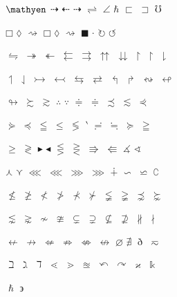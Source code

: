 \documentclass{article}
\begin{document}
$\mathyen$ $\rightdasharrow$ $\leftdasharrow$ $\rightdasharrow$ $\rightleftharpoons$ $\angle$ $\hbar$ $\sqsubset$ $\sqsupset$ $\mho$

$\mdlgwhtsquare$ $\mdlgwhtlozenge$ $\rightsquigarrow$ $\mdlgwhtsquare$ $\mdlgwhtlozenge$ $\rightsquigarrow$ $\mdlgblksquare$ $\cdotp$ $\cwopencirclearrow$ $\acwopencirclearrow$

$\leftrightharpoons$ $\twoheadrightarrow$ $\twoheadleftarrow$ $\leftleftarrows$ $\rightrightarrows$ $\upuparrows$ $\downdownarrows$ $\upharpoonright$ $\upharpoonright$ $\downharpoonright$

$\upharpoonleft$ $\downharpoonleft$ $\rightarrowtail$ $\leftarrowtail$ $\leftrightarrows$ $\rightleftarrows$ $\Lsh$ $\Rsh$ $\leftrightsquigarrow$ $\looparrowleft$

$\looparrowright$ $\succsim$ $\gtrsim$ $\therefore$ $\because$ $\Doteq$ $\Doteq$ $\precsim$ $\lesssim$ $\curlyeqprec$

$\curlyeqsucc$ $\preccurlyeq$ $\leqq$ $\leqslant$ $\lessgtr$ $\backprime$ $\risingdotseq$ $\fallingdotseq$ $\succcurlyeq$ $\geqq$

$\geqslant$ $\gtrless$ $\blacktriangleright$ $\blacktriangleleft$ $\lesseqgtr$ $\gtreqless$ $\Rrightarrow$ $\Lleftarrow$ $\measuredangle$ $\sphericalangle$

$\curlywedge$ $\curlyvee$ $\lll$ $\lll$ $\ggg$ $\ggg$ $\dotplus$ $\backsim$ $\backsimeq$ $\complement$

$\nleq$ $\ngeq$ $\nless$ $\ngtr$ $\nprec$ $\nsucc$ $\lneqq$ $\gneqq$ $\precnsim$ $\succnsim$

$\lnsim$ $\gnsim$ $\nsim$ $\ncong$ $\subsetneq$ $\supsetneq$ $\nsubseteq$ $\nsupseteq$ $\nparallel$ $\nmid$

$\nleftarrow$ $\nrightarrow$ $\nLeftarrow$ $\nRightarrow$ $\nLeftrightarrow$ $\nleftrightarrow$ $\varnothing$ $\nexists$ $\eth$ $\eqsim$

$\beth$ $\gimel$ $\daleth$ $\lessdot$ $\gtrdot$ $\approxeq$ $\curvearrowleft$ $\curvearrowright$ $\varkappa$ $\Bbbk$

$\hslash$ $\backepsilon$
\end{document}
